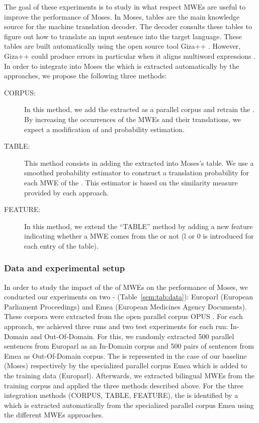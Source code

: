 \documentclass[output=paper,modfonts,nonflat]{langsci/langscibook}
\begin{document}
The goal of these experiments is to study in what respect MWEs are useful to improve the performance of Moses. In Moses,  tables are the main knowledge source for the machine translation decoder. The decoder consults these tables to figure out how to translate an input sentence into the target language. These tables are built automatically using the open source  tool Giza++ \citep{och2000improved}. However, Giza++ could produce errors in particular when it aligns multiword expressions \citep{fraser2007measuring}. In order to integrate into Moses the  which is extracted automatically by the  approaches, we propose the following three methods:
\begin{description}
\item[CORPUS:] In this method, we add the extracted  as a parallel corpus and retrain the . By increasing the occurrences of the MWEs and their translations, we expect a modification of  and probability estimation.
 \item[TABLE:] This method consists in adding the extracted  into Moses’s  table. We use a smoothed probability estimator to construct a translation probability for each MWE of the . This estimator is based on the similarity measure provided by each  approach.
 \item[FEATURE:] In this method, we extend the ``TABLE'' method by adding a new feature indicating whether a MWE comes from the  or not (l or 0 is introduced for each entry of the  table).
\end{description}



\subsubsection{Data and experimental setup}
In order to study the impact of the  of MWEs on the performance of Moses, we conducted our experiments on two -  (Table~\ref{sem:tab:data}): Europarl (European Parliament Proceedings) and Emea (European Medicines Agency Documents). These corpora were extracted from the open parallel corpus OPUS \citep{tiedemann2012parallel}. For each  approach, we achieved three runs and two test experiments for each run: In-Domain and Out-Of-Domain. For this, we randomly extracted 500 parallel sentences from Europarl as an In-Domain corpus and 500 pairs of sentences from Emea as Out-Of-Domain corpus. The  is represented in the case of our baseline (Moses) respectively by the specialized parallel corpus Emea which is added to the training data (Europarl). Afterwards, we extracted bilingual MWEs from the training corpus and applied the three methods described above. For the three integration methods (CORPUS, TABLE, FEATURE), the  is identified by a  which is extracted automatically from the specialized parallel corpus Emea using the different MWEs  approaches.
\end{document}
